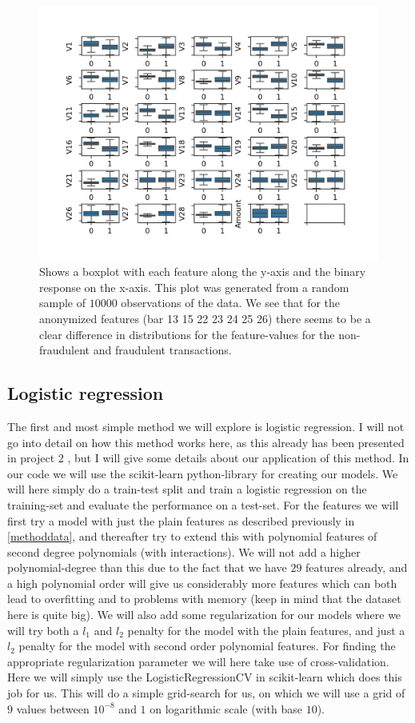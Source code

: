 \documentclass{article}
\begin{document}
\begin{figure}
	\centering
	\includegraphics[scale=0.8]{data_features_boxplot}
	\caption{Shows a boxplot with each feature along the y-axis and the
		binary response on the x-axis. This plot was generated from a random
		sample of $10 000$ observations of the data. We see that for the anonymized
		features (bar 13 15 22 23 24 25 26) there seems to be a clear difference in
		distributions for the feature-values for the non-fraudulent and fraudulent
		transactions.}
	\label{databoxplot}
\end{figure}


\subsection{Logistic regression}
The first and most simple method we will explore is logistic regression. I
will not go into detail on how this method works here, as this already has been
presented in project 2 \cite{reportproject2}, but I will give some details
about our application of this method. In our code we will use the scikit-learn
python-library for creating our models. We will here simply do a train-test
split and train a logistic regression on the training-set and evaluate the
performance on a test-set. For the features we will first try a model with just
the plain features as described previously in \ref{methoddata}, and thereafter
try to extend this with polynomial features of second degree polynomials (with
interactions). We will not add a higher polynomial-degree than this due to the
fact that we have $29$ features already, and a high polynomial order will give us
considerably more features which can both lead to overfitting and to problems
with memory (keep in mind that the dataset here is quite big). We will also add
some regularization for our models where we will try both a $l_1$ and $l_2$
penalty for the model with the plain features, and just a $l_2$ penalty for the
model with second order polynomial features. For finding the appropriate
regularization parameter we will here take use of cross-validation.  Here we
will simply use the LogisticRegressionCV in scikit-learn which does this job for
us. This will do a simple grid-search for us, on which we will use a grid of $9$
values between $10^{-8}$ and $1$ on logarithmic scale (with base $10$).
\end{document}
